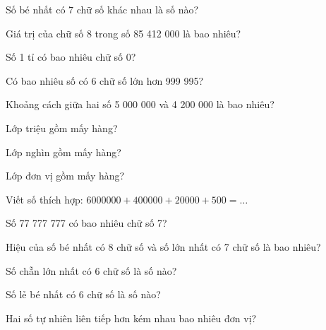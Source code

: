 \begin{ex}
Số bé nhất có 7 chữ số khác nhau là số nào?
\end{ex}

\begin{ex}
Giá trị của chữ số 8 trong số 85 412 000 là bao nhiêu?
\end{ex}

\begin{ex}
Số 1 tỉ có bao nhiêu chữ số 0?
\end{ex}

\begin{ex}
Có bao nhiêu số có 6 chữ số lớn hơn 999 995?
\end{ex}

\begin{ex}
Khoảng cách giữa hai số 5 000 000 và 4 200 000 là bao nhiêu?
\end{ex}

\begin{ex}
Lớp triệu gồm mấy hàng?
\end{ex}

\begin{ex}
Lớp nghìn gồm mấy hàng?
\end{ex}

\begin{ex}
Lớp đơn vị gồm mấy hàng?
\end{ex}

\begin{ex}
Viết số thích hợp: $6000000 + 400000 + 20000 + 500 = \dots$
\end{ex}

\begin{ex}
Số 77 777 777 có bao nhiêu chữ số 7?
\end{ex}

\begin{ex}
Hiệu của số bé nhất có 8 chữ số và số lớn nhất có 7 chữ số là bao nhiêu?
\end{ex}

\begin{ex}
Số chẵn lớn nhất có 6 chữ số là số nào?
\end{ex}

\begin{ex}
Số lẻ bé nhất có 6 chữ số là số nào?
\end{ex}

\begin{ex}
Hai số tự nhiên liên tiếp hơn kém nhau bao nhiêu đơn vị?
\end{ex}
